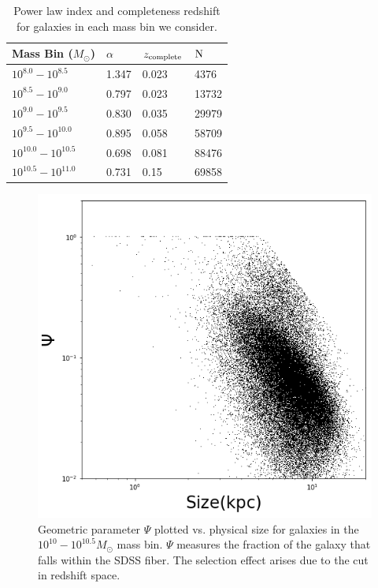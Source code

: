 \documentclass[iop]{emulateapj}
\begin{document}
\begin{table}[]
	\centering

	\label{tab:info}
	\begin{tabular}{llll} 
	\hline 
	Mass Bin ($M_{\odot}$)& $\alpha$ & $z_{\rm complete}$ 	&  $\rm N$ \\
	\hline
	\hline 
	$10^{8.0} - 10^{8.5}$   & 1.347 & 0.023 & 4376 \\ 
	$10^{8.5} - 10^{9.0}$   & 0.797 & 0.023 & 13732\\
	$10^{9.0} - 10^{9.5}$   & 0.830  & 0.035  & 29979 \\ 
	$10^{9.5} - 10^{10.0}$   & 0.895    & 0.058 & 58709 \\
	$10^{10.0} - 10^{10.5}$   &  0.698 & 0.081 & 88476 \\
	$10^{10.5} - 10^{11.0}$   &  0.731 & 0.15 & 69858 \\
	\hline 
	\end{tabular}
		\caption{Power law index and completeness redshift for galaxies in each mass bin we consider. }
\end{table}


\begin{figure}
	\centering
	\includegraphics[width=1 \columnwidth]{geometry_9_5.png}
	\caption{Geometric parameter $\Psi$ plotted vs. physical size for galaxies in the $10^{10} - 10^{10.5} M_{\odot}$ mass bin. $\Psi$ measures the fraction of the galaxy that falls within the SDSS fiber. The selection effect arises due to the cut in redshift space.}
     \label{fig:geo}

\end{figure}
\end{document}
